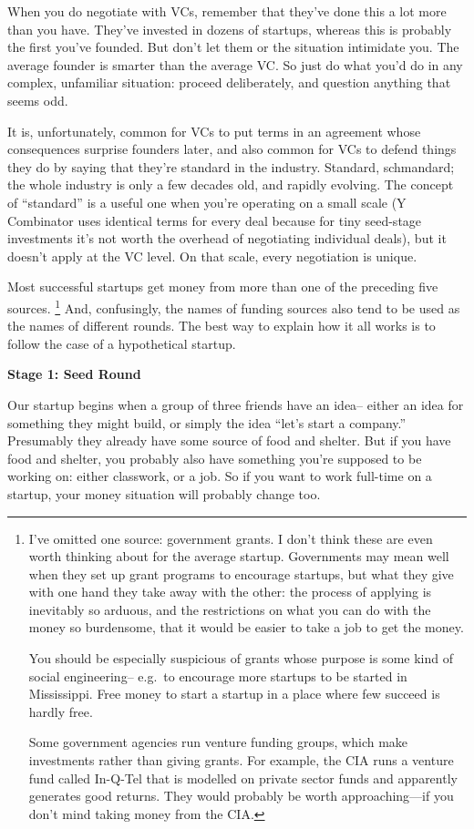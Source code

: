 \documentclass[12pt]{book}
\begin{document}
When you do negotiate with VCs, remember that they've done this a lot
more than you have. They've invested in dozens of startups, whereas this
is probably the first you've founded. But don't let them or the
situation intimidate you. The average founder is smarter than the
average VC. So just do what you'd do in any complex, unfamiliar
situation: proceed deliberately, and question anything that seems odd.

It is, unfortunately, common for VCs to put terms in an agreement whose
consequences surprise founders later, and also common for VCs to defend
things they do by saying that they're standard in the industry.
Standard, schmandard; the whole industry is only a few decades old, and
rapidly evolving. The concept of ``standard'' is a useful one when
you're operating on a small scale (Y Combinator uses identical terms for
every deal because for tiny seed-stage investments it's not worth the
overhead of negotiating individual deals), but it doesn't apply at the
VC level. On that scale, every negotiation is unique.

Most successful startups get money from more than one of the preceding
five sources. \footnote{I've omitted one source: government grants. I don't think these
are even worth thinking about for the average startup. Governments may
mean well when they set up grant programs to encourage startups, but
what they give with one hand they take away with the other: the process
of applying is inevitably so arduous, and the restrictions on what you
can do with the money so burdensome, that it would be easier to take a
job to get the money.

You should be especially suspicious of grants whose purpose is some kind
of social engineering-- e.g.~to encourage more startups to be started in
Mississippi. Free money to start a startup in a place where few succeed
is hardly free.

Some government agencies run venture funding groups, which make
investments rather than giving grants. For example, the CIA runs a
venture fund called In-Q-Tel that is modelled on private sector funds
and apparently generates good returns. They would probably be worth
approaching---if you don't mind taking money from the CIA.} And, confusingly, the names of
funding sources also tend to be used as the names of different rounds.
The best way to explain how it all works is to follow the case of a
hypothetical startup.

\textbf{Stage 1: Seed Round}

Our startup begins when a group of three friends have an idea-- either
an idea for something they might build, or simply the idea ``let's start
a company.'' Presumably they already have some source of food and
shelter. But if you have food and shelter, you probably also have
something you're supposed to be working on: either classwork, or a job.
So if you want to work full-time on a startup, your money situation will
probably change too.
\end{document}
